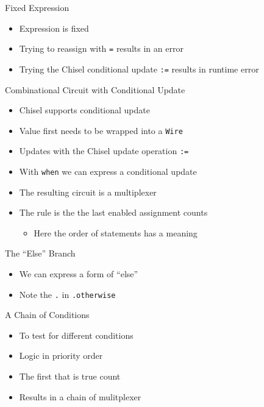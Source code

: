 \documentclass[xcolor=pdflatex,dvipsnames,table]{beamer}
\newcommand{\code}[1]{{\texttt{#1}}}
\begin{document}
\begin{frame}[fragile]{Fixed Expression}
\begin{itemize}
\item Expression is fixed
\item Trying to reassign with \code{=} results in an error
\item Trying the Chisel conditional update \code{:=} results in runtime error
\end{itemize}
\end{frame}

\begin{frame}[fragile]{Combinational Circuit with Conditional Update}
\begin{itemize}
\item Chisel supports conditional update
\item Value first needs to be wrapped into a \code{Wire}
\item Updates with the Chisel update operation \code{:=}
\item With \code{when} we can express a conditional update
\item The resulting circuit is a multiplexer
\item The rule is the the last enabled assignment counts
\begin{itemize}
\item Here the order of statements has a meaning
\end{itemize}
\end{itemize}
\end{frame}

\begin{frame}[fragile]{The ``Else'' Branch}
\begin{itemize}
\item We can express a form of ``else''
\item Note the \code{.} in \code{.otherwise}
\end{itemize}
\end{frame}


\begin{frame}[fragile]{A Chain of Conditions}
\begin{itemize}
\item To test for different conditions
\item Logic in priority order
\item The first that is true count
\item Results in a chain of mulitplexer
\end{itemize}
\end{frame}
\end{document}
